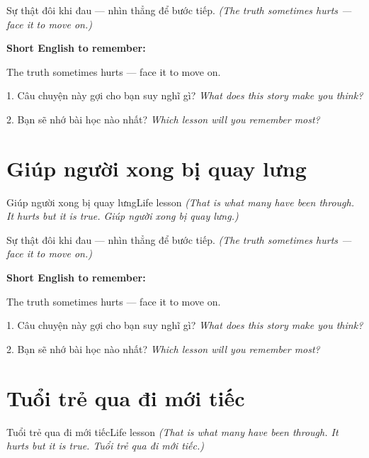 \begin{baihoc}
Sự thật đôi khi đau — nhìn thẳng để bước tiếp.
\textit{(The truth sometimes hurts — face it to move on.)}
\end{baihoc}

\begin{ghinhoanh}
\textbf{Short English to remember:}

The truth sometimes hurts — face it to move on.

\end{ghinhoanh}

\begin{tuhocnhanh}
1. Câu chuyện này gợi cho bạn suy nghĩ gì? \textit{What does this story make you think?}

2. Bạn sẽ nhớ bài học nào nhất? \textit{Which lesson will you remember most?}
\end{tuhocnhanh}
\ngancach


\section{Giúp người xong bị quay lưng}
\begin{truyen}{Giúp người xong bị quay lưng}{Life lesson}
\textit{(That is what many have been through. It hurts but it is true. Giúp người xong bị quay lưng.)}
\end{truyen}

\begin{baihoc}
Sự thật đôi khi đau — nhìn thẳng để bước tiếp.
\textit{(The truth sometimes hurts — face it to move on.)}
\end{baihoc}

\begin{ghinhoanh}
\textbf{Short English to remember:}

The truth sometimes hurts — face it to move on.

\end{ghinhoanh}

\begin{tuhocnhanh}
1. Câu chuyện này gợi cho bạn suy nghĩ gì? \textit{What does this story make you think?}

2. Bạn sẽ nhớ bài học nào nhất? \textit{Which lesson will you remember most?}
\end{tuhocnhanh}
\ngancach


\section{Tuổi trẻ qua đi mới tiếc}
\begin{truyen}{Tuổi trẻ qua đi mới tiếc}{Life lesson}
\textit{(That is what many have been through. It hurts but it is true. Tuổi trẻ qua đi mới tiếc.)}
\end{truyen}

